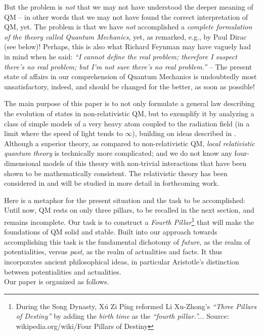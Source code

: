\documentclass[12pt]{article}
\begin{document}
But the problem is \textit{not} that we may not have understood the deeper meaning of QM -- in other words that we may not 
have found the correct interpretation of QM, yet. The problem is that we have \textit{not} accomplished a \textit{complete 
formulation of the theory called Quantum Mechanics}, yet, as remarked, e.g., by {Paul Dirac} (see 
below)!  Perhaps, this is also what {Richard Feynman} may have vaguely had in mind when he said: 
\textit{``I cannot define the real problem; therefore I suspect there's no real problem; but I'm not sure there's no real problem.''} 
-- The present state of affairs in our comprehension of Quantum Mechanics is undoubtedly most unsatisfactory, 
indeed, and should be changed for the better, as soon as possible! 

The main purpose of this paper is to not only formulate a general law describing the evolution of states in non-relativistic QM, 
but to exemplify it by analyzing a class of simple models of a very heavy atom coupled to the radiation field (in a limit where 
the speed of light tends to $\infty$), building on ideas described in \cite{F-Schub, BFS, Fr1, LMU-19}.  Although a superior theory, 
as compared to non-relativistic QM, \textit{local relativistic quantum theory} is  technically more complicated; and we do  
not  know any four-dimensional models of this theory with non-trivial interactions that have been shown to be mathematically 
consistent. The relativistic theory has been considered in \cite{Fr2} and will be studied in more detail in forthcoming work.

Here is a metaphor for the present situation and the task to be accomplished: Until now, QM rests on  only 
three pillars, to be recalled in the next section, and remains incomplete. Our task is to construct a \textit{Fourth Pillar}\footnote{During the Song Dynasty, X\'u Zi Píng reformed Li Xu-Zhong's \textit{``Three Pillars of Destiny''} by adding the \textit{birth time} as the \textit{``fourth pillar.''...} Source: wikipedia.org/wiki/Four Pillars of Destiny} that will 
make the foundations of QM solid and stable. Built into our approach towards accomplishing this task is the fundamental 
dichotomy of \textit{future}, as the realm of potentialities, versus \textit{past}, as the realm of actualities 
and facts. It thus incorporates ancient philosophical ideas, in particular {Aristotle'}s distinction 
between potentialities and actualities.\\

Our paper is organized as follows.\\
\end{document}
